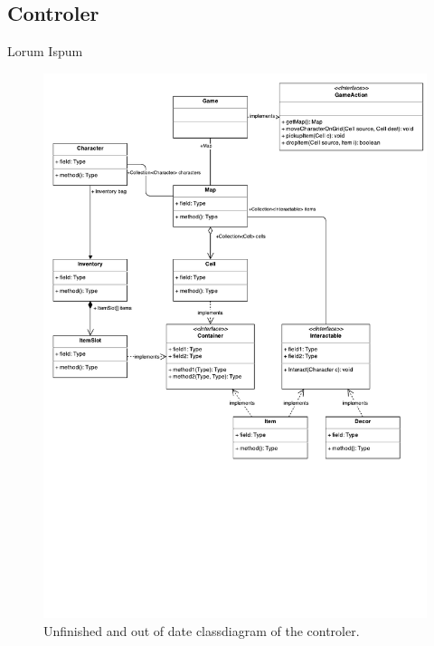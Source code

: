 \subsection{Controler}
Lorum Ispum

\begin{figure}[htbp]
	\centering
	\includegraphics[width=\textwidth]{model-classdiagram.pdf}
	\caption{Unfinished and out of date classdiagram of the controler.}
\end{figure}

\FloatBarrier